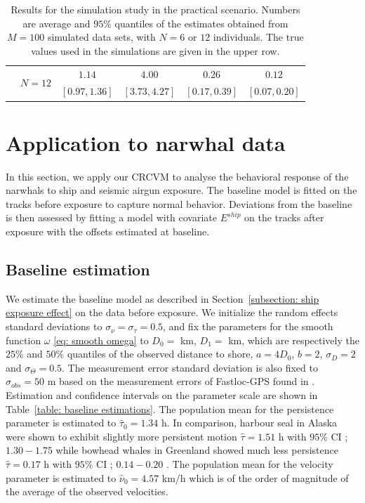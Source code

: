 \documentclass[aoas]{imsart}
\theoremstyle{definition}
\theoremstyle{remark}
\theoremstyle{remark}
\newcommand {\1}{\mathbb{1}}
\begin{document}
\begin{table}[ht!]
\begin{tabular}{|c|c|cccc|}
			\\
			& \multirow{2}{4em}{$N=12$} & $1.14$ &
			$4.00$ &
			$0.26$ & $0.12$ 

			\\
			& & $[0.97,1.36]$  &
			$ [3.73,4.27]$ &
			$ [0.17,0.39]$& $[0.07,0.20] $  \\
            \hline

		\end{tabular}
        \vspace{0.1cm}
		\caption{Results for the simulation study in the practical scenario. Numbers are average and $95 \%$ quantiles of the estimates obtained from $M=100$ simulated data sets, with $N=6$ or $12$ individuals. The true values used in the simulations are given in the upper row.}
		\label{table: simulation study lf parametric}
	\end{table}


\section{Application to narwhal data}
\label{section: application}

In this section, we apply our CRCVM to analyse the  behavioral response of the narwhals to ship and seismic airgun exposure.
The baseline model is fitted on the tracks before exposure to capture normal behavior. Deviations from the baseline is then assessed by fitting a model with covariate $E^{ship}$ on the tracks after exposure with the offsets estimated at baseline.


\subsection{Baseline estimation}
We estimate the baseline model as described in Section~\ref{subsection: ship exposure effect} on the data before exposure. We initialize the random effects standard deviations to $\sigma_{\nu}=\sigma_{\tau}=0.5$, and fix the parameters for the smooth function $\omega$ \eqref{eq: smooth omega} to $D_0= $ km, $D_1 = $ km, which are respectively the $25 \%$ and $50\%$ quantiles of the observed distance to shore, $a=4D_0$, $b=2$, $\sigma_D=2$ and $\sigma_\Theta =0.5$. The measurement error standard deviation is also fixed to $\sigma_{obs}=50$ m based on the measurement errors of Fastloc-GPS found in \citep{wensveen_path_2015}.  \\

Estimation and confidence intervals on the parameter scale are shown in Table~\ref{table: baseline estimations}. 
The population mean for the persistence parameter is estimated to $\hat{\tau}_{0}=1.34 $ h.
In comparison, harbour seal in Alaska were shown to exhibit slightly more persistent motion $\hat{\tau}=1.51$ h with $95\%$ CI ; $1.30 -1.75$  \citep{johnson_continuous_2008} while bowhead whales in Greenland showed much less persistence $\hat{\tau}=0.17$ h with $95\%$ CI ; $0.14 -0.20$  \citep{gurarie_correlated_2017}.
The population mean for the velocity parameter is estimated to $\hat{\nu}_{0}=4.57$ km/h which is of the order of magnitude of the average of the observed velocities.
\end{document}

